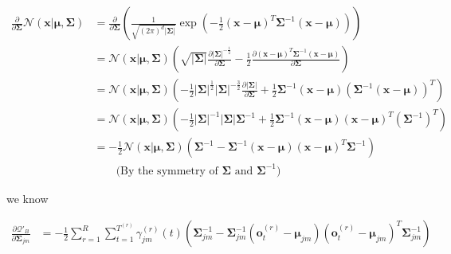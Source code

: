 \documentclass{article}
\begin{document}
    \vspace{-2.5em}
    \begin{align*}
        \frac{\partial}{\partial\boldsymbol{\Sigma}}\mathcal{N}(\mathbf{x}|\boldsymbol{\mu},\boldsymbol{\Sigma}) &= \frac{\partial}{\partial\boldsymbol{\Sigma}}\left(\frac{1}{\sqrt{(2\pi)^d|\boldsymbol{\Sigma}|}}\exp\left(-\frac{1}{2}(\mathbf{x}-\boldsymbol{\mu})^T\boldsymbol{\Sigma}^{-1}(\mathbf{x}-\boldsymbol{\mu})\right)\right) \\
        &= \mathcal{N}(\mathbf{x}|\boldsymbol{\mu},\boldsymbol{\Sigma})\left(\sqrt{|\boldsymbol{\Sigma}|}\frac{\partial|\boldsymbol{\Sigma}|^{-\frac{1}{2}}}{\partial\boldsymbol{\Sigma}}-\frac{1}{2}\frac{\partial(\mathbf{x}-\boldsymbol{\mu})^T\boldsymbol{\Sigma}^{-1}(\mathbf{x}-\boldsymbol{\mu})}{\partial\boldsymbol{\Sigma}}\right)\\
        &= \mathcal{N}(\mathbf{x}|\boldsymbol{\mu},\boldsymbol{\Sigma})\left(-\frac{1}{2}|\boldsymbol{\Sigma}|^{\frac{1}{2}}|\boldsymbol{\Sigma}|^{-\frac{3}{2}}\frac{\partial|\boldsymbol{\Sigma}|}{\partial\boldsymbol{\Sigma}}
        +\frac{1}{2}\boldsymbol{\Sigma}^{-1}(\mathbf{x}-\boldsymbol{\mu})\left(\boldsymbol{\Sigma}^{-1}(\mathbf{x}-\boldsymbol{\mu})\right)^T\right)\quad\ \ \\
        &= \mathcal{N}(\mathbf{x}|\boldsymbol{\mu},\boldsymbol{\Sigma})\left(-\frac{1}{2}|\boldsymbol{\Sigma}|^{-1}|\boldsymbol{\Sigma}|\boldsymbol{\Sigma}^{-1}
        +\frac{1}{2}\boldsymbol{\Sigma}^{-1}(\mathbf{x}-\boldsymbol{\mu})(\mathbf{x}-\boldsymbol{\mu})^T\left(\boldsymbol{\Sigma}^{-1}\right)^T\right) \\
        &= -\frac{1}{2}\mathcal{N}(\mathbf{x}|\boldsymbol{\mu},\boldsymbol{\Sigma})\left(\boldsymbol{\Sigma}^{-1}
        -\boldsymbol{\Sigma}^{-1}(\mathbf{x}-\boldsymbol{\mu})(\mathbf{x}-\boldsymbol{\mu})^T\boldsymbol{\Sigma}^{-1}\right) \\
        &\qquad\text{(By the symmetry of $\boldsymbol{\Sigma}$ and $\boldsymbol{\Sigma}^{-1}$)}
    \end{align*}
    
    \vspace{-1.5em}
    we know
    
    \vspace{-2.7em}
    \begin{align*}
         \frac{\partial\mathcal{Q}'_B}{\partial\boldsymbol{\Sigma}_{jm}} &=
         -\frac{1}{2}\sum_{r=1}^R\sum_{t=1}^{T^{(r)}}\gamma_{jm}^{(r)}(t)\left(\boldsymbol{\Sigma}_{jm}^{-1}
        -\boldsymbol{\Sigma}_{jm}^{-1}\left(\mathbf{o}^{(r)}_t-\boldsymbol{\mu}_{jm}\right)\left(\mathbf{o}^{(r)}_t-\boldsymbol{\mu}_{jm}\right)^T\boldsymbol{\Sigma}_{jm}^{-1}\right)
    \end{align*}
    
\end{document}
